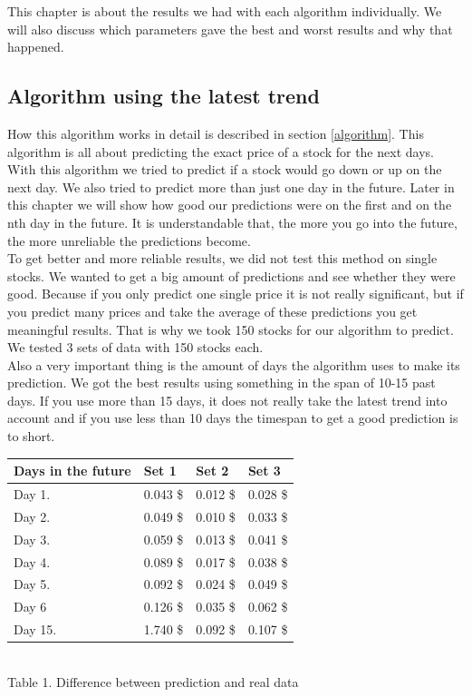 \documentclass[conference]{IEEEtran}
\begin{document}
This chapter is about the results we had with each algorithm individually. We will also discuss which parameters gave the best and worst results and why that happened. 

\subsection{Algorithm using the latest trend}

How this algorithm works in detail is described in section \ref{algorithm}. This algorithm is all about predicting the exact price of a stock for the next days. With this algorithm we tried to predict if a stock would go down or up on the next day. We also tried to predict more than just one day in the future. Later in this chapter we will show how good our predictions were on the first and on the nth day in the future. It is understandable that, the more you go into the future, the more unreliable the predictions become. 
\\
To get better and more reliable results, we did not test this method on single stocks. We wanted to get a big amount of predictions and see whether they were good. Because if you only predict one single price it is not really significant, but if you predict many prices and take the average of these predictions you get meaningful results. That is why we took 150 stocks for our algorithm to predict. We tested 3 sets of data with 150 stocks each.
\\
Also a very important thing is the amount of days the algorithm uses to make its prediction. We got the best results using something in the span of 10-15 past days. If you use more than 15 days, it does not really take the latest trend into account and if you use less than 10 days the timespan to get a good prediction is to short.
\\
\begin{center}
\begin{tabularx}{0.49\textwidth}{|X|X|X|X|}
\hline
Days in the future & Set 1 & Set 2 & Set 3\\
\hline
\hline
Day 1. & 0.043 \$ & 0.012 \$ & 0.028 \$\\
\hline
Day 2. & 0.049 \$ & 0.010 \$ & 0.033 \$\\
\hline
Day 3. & 0.059 \$ & 0.013 \$ & 0.041 \$\\
\hline
Day 4. & 0.089 \$ & 0.017 \$ & 0.038 \$\\
\hline
Day 5. & 0.092 \$ & 0.024 \$ & 0.049 \$\\
\hline
Day 6 & 0.126 \$ & 0.035 \$ & 0.062 \$\\
\hline
\hline
Day 15. & 1.740 \$ & 0.092 \$ & 0.107 \$\\
\hline

\end{tabularx}
\\[5pt]
Table 1. Difference between prediction and real data
\end{center}
\end{document}
